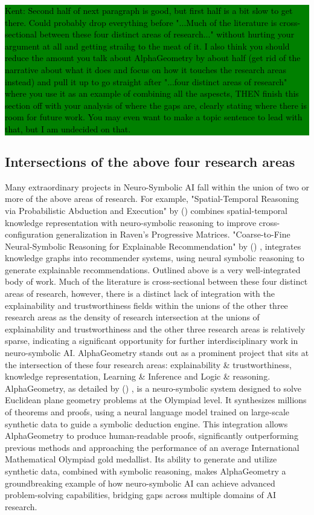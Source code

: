 \documentclass[hf]{ceurart}
\newcommand{\citeauthornum}[1]{\citeauthor{#1} (\citeyear{#1}) \cite{#1}}
\newcommand{\pinaforecomment}[4]{\colorbox{#1}{\textcolor{#4}{\parbox{.8\linewidth}{#2: #3}}}}
\newcommand{\osullikomment}[1]{\pinaforecomment{green}{Kent}{#1}{black}}
\begin{document}
\osullikomment{Second half of next paragraph is good, but first half is a bit slow to get there. Could probably drop everything before "...Much of the literature is cross-sectional between these four distinct areas of research..." without hurting your argument at all and getting straihg to the meat of it. I also think you should reduce the amount you talk about AlphaGeometry by about half (get rid of the narrative about what it does and focus on how it touches the research areas instead) and pull it up to go straight after "...four distinct areas of research" where you use it as an example of combining all the aspescts, THEN finish this section off with your analysis of where the gaps are, clearly stating where there is room for future work. You may even want to make a topic sentence to lead with that, but I am undecided on that. }
\subsection{Intersections of the above four research areas}
Many extraordinary projects in Neuro-Symbolic AI fall within the union of two or more of the above areas of research. For example, "Spatial-Temporal Reasoning via Probabilistic Abduction and Execution" by \citeauthornum{Zhang2021} combines spatial-temporal knowledge representation with neuro-symbolic reasoning to improve cross-configuration generalization in Raven's Progressive Matrices. "Coarse-to-Fine Neural-Symbolic Reasoning for Explainable Recommendation" by \citeauthornum{Xian2020}, integrates knowledge graphs into recommender systems, using neural symbolic reasoning to generate explainable recommendations. Outlined above is a very well-integrated body of work. Much of the literature is cross-sectional between these four distinct areas of research, however, there is a distinct lack of integration with the explainability and trustworthiness fields within the unions of the other three research areas as the density of research intersection at the unions of explainability and trustworthiness and the other three research areas is relatively sparse, indicating a significant opportunity for further interdisciplinary work in neuro-symbolic AI.
AlphaGeometry stands out as a prominent project that sits at the intersection of these four research areas: explainability \& trustworthiness, knowledge representation, Learning \& Inference and Logic \& reasoning. AlphaGeometry, as detailed by \citeauthornum{Trinh2024}, is a neuro-symbolic system designed to solve Euclidean plane geometry problems at the Olympiad level. It synthesizes millions of theorems and proofs, using a neural language model trained on large-scale synthetic data to guide a symbolic deduction engine. This integration allows AlphaGeometry to produce human-readable proofs, significantly outperforming previous methods and approaching the performance of an average International Mathematical Olympiad gold medallist. Its ability to generate and utilize synthetic data, combined with symbolic reasoning, makes AlphaGeometry a groundbreaking example of how neuro-symbolic AI can achieve advanced problem-solving capabilities, bridging gaps across multiple domains of AI research.
\end{document}
